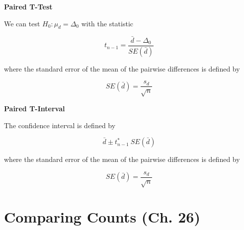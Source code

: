 \documentclass{article}
\theoremstyle{definition}
\begin{document}
\vspace{2ex}
\textbf{Paired T-Test}

We can test $H_0: \mu_d = \Delta_0$ with the statistic

\begin{equation}
    t_{n-1} = \frac{\bar{d} - \Delta_0}{SE(\bar{d})}
\end{equation}

where the standard error of the mean of the pairwise differences is defined by

\begin{equation}
    SE(\bar{d}) = \frac{s_d}{\sqrt{n}}
\end{equation}

\vspace{2ex}
\textbf{Paired T-Interval}

The confidence interval is defined by

\begin{equation}
    \bar{d} \pm t_{n-1}^*\ SE(\bar{d})
\end{equation}

where the standard error of the mean of the pairwise differences is defined by

\begin{equation}
    SE(\bar{d}) = \frac{s_d}{\sqrt{n}}
\end{equation}

\pagebreak

\section{Comparing Counts (Ch. 26)}
\end{document}
